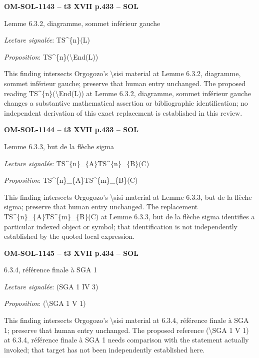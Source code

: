 \par\noindent\textbf{OM-SOL-1143 -- t3 XVII p.433 -- SOL}\par
Lemme 6.3.2, diagramme, sommet inférieur gauche\par
\emph{Lecture signalée}: TS\textasciicircum{}\{n\}(L)\par
\emph{Proposition}: TS\textasciicircum{}\{n\}(\textbackslash{}End(L))\par
This finding intersects Orgogozo's \textbackslash{}sisi material at Lemme 6.3.2, diagramme, sommet inférieur gauche; preserve that human entry unchanged. The proposed reading TS\textasciicircum{}\{n\}(\textbackslash{}End(L)) at Lemme 6.3.2, diagramme, sommet inférieur gauche changes a substantive mathematical assertion or bibliographic identification; no independent derivation of this exact replacement is established in this review.\par
\par\noindent\textbf{OM-SOL-1144 -- t3 XVII p.433 -- SOL}\par
Lemme 6.3.3, but de la flèche sigma\par
\emph{Lecture signalée}: TS\textasciicircum{}\{n\}\_\{A\}TS\textasciicircum{}\{n\}\_\{B\}(C)\par
\emph{Proposition}: TS\textasciicircum{}\{n\}\_\{A\}TS\textasciicircum{}\{m\}\_\{B\}(C)\par
This finding intersects Orgogozo's \textbackslash{}sisi material at Lemme 6.3.3, but de la flèche sigma; preserve that human entry unchanged. The replacement TS\textasciicircum{}\{n\}\_\{A\}TS\textasciicircum{}\{m\}\_\{B\}(C) at Lemme 6.3.3, but de la flèche sigma identifies a particular indexed object or symbol; that identification is not independently established by the quoted local expression.\par
\par\noindent\textbf{OM-SOL-1145 -- t3 XVII p.434 -- SOL}\par
6.3.4, référence finale à SGA 1\par
\emph{Lecture signalée}: (SGA 1 IV 3)\par
\emph{Proposition}: (\textbackslash{}SGA 1 V 1)\par
This finding intersects Orgogozo's \textbackslash{}sisi material at 6.3.4, référence finale à SGA 1; preserve that human entry unchanged. The proposed reference (\textbackslash{}SGA 1 V 1) at 6.3.4, référence finale à SGA 1 needs comparison with the statement actually invoked; that target has not been independently established here.\par
